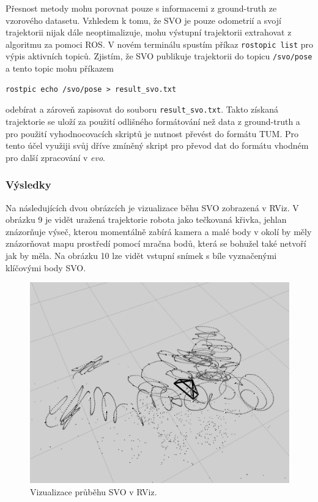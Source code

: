 \documentclass[12pt,a4paper]{article}
\begin{document}
Přesnost metody mohu porovnat pouze s informacemi z ground-truth ze vzorového datasetu. Vzhledem k tomu, že SVO je pouze odometrií a svojí trajektorii nijak dále neoptimalizuje, mohu výstupní trajektorii extrahovat z algoritmu za pomoci ROS. V novém terminálu spustím příkaz \texttt{rostopic list} pro výpis aktivních topiců. Zjistím, že SVO publikuje trajektorii do topicu \texttt{/svo/pose} a tento topic mohu příkazem 
\begin{verbatim}
rostpic echo /svo/pose > result_svo.txt
\end{verbatim}
 odebírat a zároveň zapisovat do souboru \texttt{result\_svo.txt}. Takto získaná trajektorie se uloží za použití odlišného formátování než data z ground-truth a pro použití vyhodnocovacích skriptů je nutnost převést do formátu TUM. Pro tento účel využiji svůj dříve zmíněný skript pro převod dat do formátu vhodném pro další zpracování v \textit{evo}.

\subsubsection*{Výsledky} 
Na následujících dvou obrázcích je vizualizace běhu SVO zobrazená v RViz. V obrázku 9 je vidět uražená trajektorie robota jako tečkovaná křivka, jehlan znázorňuje výseč, kterou momentálně zabírá kamera a malé body v okolí by měly znázorňovat mapu prostředí pomocí mračna bodů, která se bohužel také netvoří jak by měla. Na obrázku 10 lze vidět vstupní snímek s bíle vyznačenými klíčovými body SVO.
 
\begin{figure}[H]
\centering
\includegraphics[scale=0.5]{img/SVO_rviz_1.png}
\caption{Vizualizace průběhu SVO v RViz.}
\end{figure}
\end{document}
